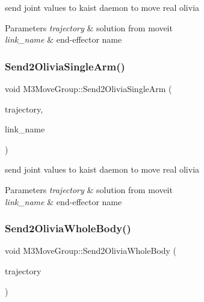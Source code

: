 send joint values to kaist daemon to move real olivia 


\begin{DoxyParams}{Parameters}
{\em trajectory} & solution from moveit \\
\hline
{\em link\+\_\+name} & end-\/effector name \\
\hline
\end{DoxyParams}
\mbox{\label{classM3MoveGroup_a0b0b4680d729b8878a89ba03c6d59303}} 
\subsubsection{\texorpdfstring{Send2\+Olivia\+Single\+Arm()}{Send2OliviaSingleArm()}\hspace{0.1cm}{\footnotesize\ttfamily [2/2]}}
{\footnotesize\ttfamily void M3\+Move\+Group\+::\+Send2\+Olivia\+Single\+Arm (\begin{DoxyParamCaption}\item[{moveit\+\_\+msgs\+::\+Robot\+Trajectory}]{trajectory,  }\item[{std\+::string}]{link\+\_\+name }\end{DoxyParamCaption})\hspace{0.3cm}{\ttfamily [inline]}}



send joint values to kaist daemon to move real olivia 


\begin{DoxyParams}{Parameters}
{\em trajectory} & solution from moveit \\
\hline
{\em link\+\_\+name} & end-\/effector name \\
\hline
\end{DoxyParams}
\mbox{\label{classM3MoveGroup_a8adcfcf74c2e2350189be855dca572de}} 
\subsubsection{\texorpdfstring{Send2\+Olivia\+Whole\+Body()}{Send2OliviaWholeBody()}\hspace{0.1cm}{\footnotesize\ttfamily [1/2]}}
{\footnotesize\ttfamily void M3\+Move\+Group\+::\+Send2\+Olivia\+Whole\+Body (\begin{DoxyParamCaption}\item[{moveit\+\_\+msgs\+::\+Robot\+Trajectory}]{trajectory }\end{DoxyParamCaption})\hspace{0.3cm}{\ttfamily [inline]}}



